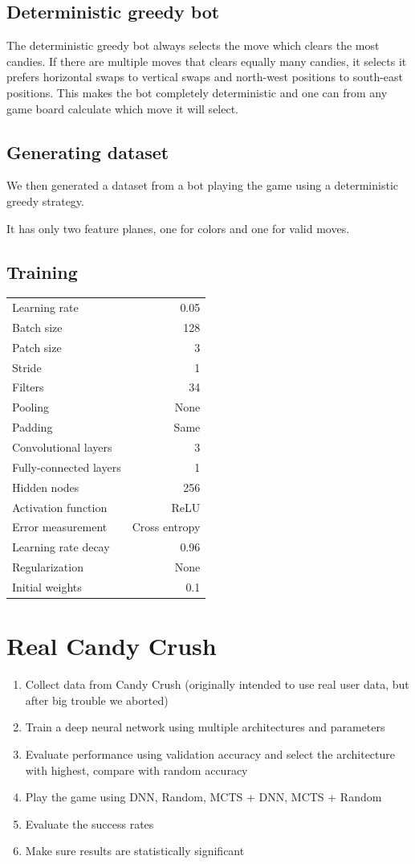 \documentclass{kththesis}
\begin{document}
\subsection{Deterministic greedy bot}
The deterministic greedy bot always selects the move which clears the most candies. If there are multiple moves that clears equally many candies, it selects it prefers horizontal swaps to vertical swaps  and north-west positions to south-east positions. This makes the bot completely deterministic and one can from any game board calculate which move it will select.

\subsection{Generating dataset}
We then generated a dataset from a bot playing the game using a deterministic greedy strategy.

It has only two feature planes, one for colors and one for valid moves.

\subsection{Training}
\begin{tabular}{ l | r }
Learning rate & 0.05 \\
Batch size & 128 \\
Patch size & 3 \\
Stride & 1 \\
Filters & 34 \\
Pooling & None \\
Padding & Same \\
Convolutional layers & 3 \\
Fully-connected layers & 1 \\
Hidden nodes & 256 \\
Activation function & ReLU \\
Error measurement & Cross entropy \\
Learning rate decay & 0.96 \\
Regularization & None \\
Initial weights & 0.1 \\
\end{tabular}

\section{Real Candy Crush}
\begin{enumerate}
\item Collect data from Candy Crush (originally intended to use real user data, but after big trouble we aborted)
\item Train a deep neural network using multiple architectures and parameters
\item Evaluate performance using validation accuracy and select the architecture with highest, compare with random accuracy
\item Play the game using DNN, Random, MCTS + DNN, MCTS + Random
\item Evaluate the success rates
\item Make sure results are statistically significant
\end{enumerate}
\end{document}
